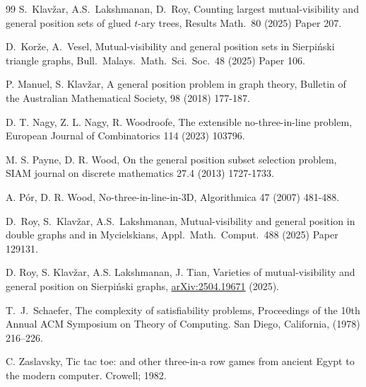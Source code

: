 \documentclass[12pt]{article}
\begin{document}
\begin{thebibliography}{99}
S.~Klav\v{z}ar, A.S.~Lakshmanan, D.~Roy,
Counting largest mutual-visibility and general position sets of glued $ t $-ary trees, Results Math.\ 80 (2025) Paper 207.

D.~Kor\v{z}e, A.~Vesel, 
Mutual-visibility and general position sets in {S}ierpi\'nski triangle graphs, Bull.\ Malays.\ Math.\ Sci.\ Soc.\ 48 (2025) Paper 106.

 P. Manuel, S. Klavžar, A general position problem in graph theory, Bulletin of the Australian Mathematical Society, 98  (2018) 177-187.

 D. T. Nagy, Z. L. Nagy, R. Woodroofe, The extensible no-three-in-line problem, European Journal of Combinatorics 114 (2023) 103796.

 M. S. Payne, D. R. Wood, On the general position subset selection problem, SIAM journal on discrete mathematics 27.4 (2013) 1727-1733.

 A. Pór, D. R. Wood, No-three-in-line-in-3D, Algorithmica 47 (2007) 481-488.

D.~Roy, S.~Klav\v{z}ar, A.S.~Lakshmanan,
Mutual-visibility and general position in double graphs and in Mycielskians, Appl.\ Math.\ Comput.\ 488 (2025) Paper 129131.

D. Roy, S. Klavžar, A.S. Lakshmanan, J. Tian, 
Varieties of mutual-visibility and general position on Sierpi\'nski graphs, \url{arXiv:2504.19671} (2025).
	    
T.~J.~Schaefer, The complexity of satisfiability problems, Proceedings of the 10th Annual ACM Symposium on Theory of Computing. San Diego, California, (1978) 216--226.

 C. Zaslavsky, Tic tac toe: and other three-in-a row games from ancient Egypt to the modern computer. Crowell; 1982.

\end{thebibliography}	    
	    
\end{document}
